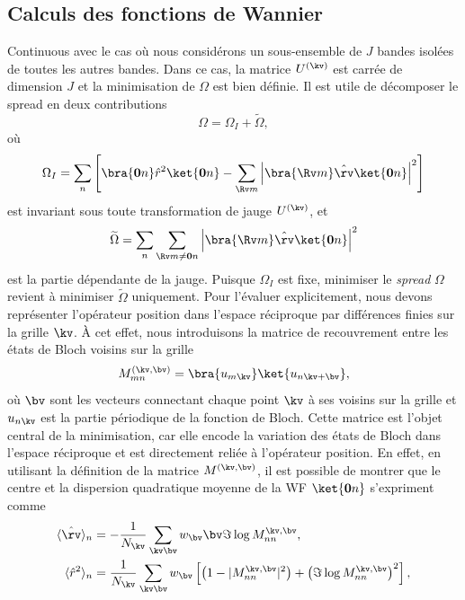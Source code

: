 \subsection{Calculs des fonctions de Wannier}
Continuous avec le cas où nous considérons un sous-ensemble de $J$ bandes isolées de toutes les autres bandes. Dans ce cas, la matrice $U^{(\kv)}$ est carrée de dimension $J$ et la minimisation de $\Omega$ est bien définie. Il est utile de décomposer le spread en deux contributions~\cite{marzariMaximallyLocalizedGeneralized1997}
\begin{equation}
    \Omega = \Omega_I + \widetilde{\Omega},
\end{equation}
où
\begin{equation}
    \Omega_I = \sum_n \left[ \bra{\mathbf{0}n}\hat{r}^2\ket{\mathbf{0}n} - 
    \sum_{\Rv m}\left|\bra{\Rv m}\hat{\rv}\ket{\mathbf{0}n}\right|^2 \right]
\end{equation}
est invariant sous toute transformation de jauge $U^{(\kv)}$, et
\begin{equation}
    \widetilde{\Omega} = \sum_n \sum_{\Rv m \neq \mathbf{0}n}
    \left|\bra{\Rv m}\hat{\rv}\ket{\mathbf{0}n}\right|^2
\end{equation}
est la partie dépendante de la jauge. Puisque $\Omega_I$ est fixe, minimiser le \textit{spread} $\Omega$ revient à minimiser $\widetilde{\Omega}$ uniquement. Pour l'évaluer explicitement, nous devons représenter l'opérateur position dans l'espace réciproque par différences finies sur la grille $\kv$. À cet effet, nous introduisons la matrice de recouvrement entre les états de Bloch voisins sur la grille 
\begin{equation}
    M^{(\kv,\bv)}_{mn}=\bra{u_{m\kv}}\ket{u_{n\kv+\bv}},
\end{equation}
où $\bv$ sont les vecteurs connectant chaque point $\kv$ à ses voisins sur la grille et $u_{n\kv}$ est la partie périodique de la fonction de Bloch. Cette matrice est l'objet central de la minimisation, car elle encode la variation des états de Bloch dans l'espace réciproque et est directement reliée à l'opérateur position. En effet, en utilisant la définition de la matrice $M^{(\kv,\bv)}$, il est possible de montrer que le centre et la dispersion quadratique moyenne de la WF $\ket{\mathbf{0}n}$ s'expriment comme
\begin{align}
    \langle \hat{\rv}\rangle_n &= -\frac{1}{N_\kv}\sum_{\kv\bv}w_\bv\bv\Im\log M_{nn}^{\kv,\bv},\label{eqn:c3_rn}\\
    \langle \hat{r}^2\rangle_n &= \frac{1}{N_\kv}\sum_{\kv\bv}w_\bv\left[\left(1-|M_{nn}^{\kv,\bv}|^2\right)+\left(\Im\log M_{nn}^{\kv,\bv}\right)^2\right],
\end{align}

